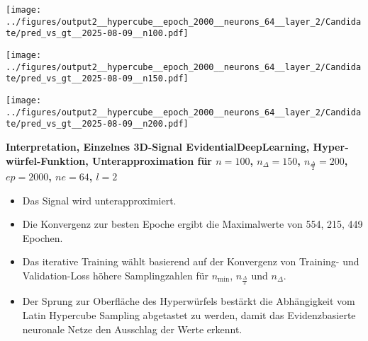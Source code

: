 \begin{otherlanguage}{ngerman}
\begin{samepage}
\begin{minipage}{\textwidth}
\vspace{0.125cm}

\begin{minipage}{0.05\textwidth}
    \centering{}
\end{minipage}%
\begin{minipage}{0.3\textwidth}
    \centering
    \texttt{[image: ../figures/output2\_\_hypercube\_\_epoch\_2000\_\_neurons\_64\_\_layer\_2/Candidate/pred\_vs\_gt\_\_2025-08-09\_\_n100.pdf]}
\end{minipage}%
\begin{minipage}{0.3\textwidth}
    \centering
    \texttt{[image: ../figures/output2\_\_hypercube\_\_epoch\_2000\_\_neurons\_64\_\_layer\_2/Candidate/pred\_vs\_gt\_\_2025-08-09\_\_n150.pdf]}
\end{minipage}%
\begin{minipage}{0.3\textwidth}
    \centering
    \texttt{[image: ../figures/output2\_\_hypercube\_\_epoch\_2000\_\_neurons\_64\_\_layer\_2/Candidate/pred\_vs\_gt\_\_2025-08-09\_\_n200.pdf]}
\end{minipage}

\label{fig:pred_vs_gt_matrix}

\end{minipage}
\end{samepage}



\clearpage

\begin{samepage}
\begin{minipage}{\textwidth}

\noindent\textbf{Interpretation, Einzelnes 3D-Signal \gls{EvidentialDeepLearning}, Hyperwürfel-Funktion,
Unterapproximation für $n=100$, $n_{\Delta}=150$, $n_{\frac{\Delta}{2}}=200$, $ep=2000$, $ne=64$, $l=2$}

\begin{itemize}
    \item Das Signal wird unterapproximiert.
    \item Die Konvergenz zur besten Epoche ergibt die Maximalwerte von 554, 215, 449 Epochen.
    \item Das iterative Training wählt basierend auf der Konvergenz von Training- und Validation-Loss höhere Samplingzahlen für $n_{\min}$, $n_{\frac{\Delta}{2}}$ und $n_{\Delta}$.
    \item Der Sprung zur Oberfläche des Hyperwürfels bestärkt die Abhängigkeit vom Latin Hypercube Sampling abgetastet zu werden, damit das \gls{Evidenzbasierte neuronale Netze} den Ausschlag der Werte erkennt. 
\end{itemize}





\end{minipage}
\end{samepage}
\end{otherlanguage}
